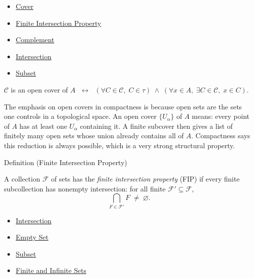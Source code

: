 \begin{dependencies}
\begin{itemize}
  \item \hyperref[def:cover-full]{Cover}
  \item \hyperref[def:fip]{Finite Intersection Property}
  \item \hyperref[def:complement]{Complement}
  \item \hyperref[def:intersection]{Intersection}
  \item \hyperref[def:subset]{Subset}
\end{itemize}
\end{dependencies}

\begin{remark*}
$\mathcal{C}$ is an open cover of $A$ $\;\leftrightarrow\;$ $(\forall C \in \mathcal{C},\; C \in \tau) \;\wedge\; (\forall x \in A,\; \exists C \in \mathcal{C},\; x \in C)$.
\end{remark*}

\begin{remark*}
The emphasis on open covers in compactness is because open sets are the
sets one controls in a topological space. An open cover $\{U_\alpha\}$ of
$A$ means: every point of $A$ has at least one $U_\alpha$ containing it. A
finite subcover then gives a list of finitely many open sets whose union
already contains all of $A$. Compactness says this reduction is always
possible, which is a very strong structural property.
\end{remark*}


\begin{definitionbox}{Definition (Finite Intersection Property)}
\begin{definition}\label{def:fip}
A collection $\mathcal{F}$ of sets has the \emph{finite intersection
property} (FIP) if every finite subcollection has nonempty intersection:
for all finite $\mathcal{F}' \subseteq \mathcal{F}$,
\[
\bigcap_{F \in \mathcal{F}'} F \;\neq\; \varnothing.
\]
\end{definition}
\end{definitionbox}

\begin{dependencies}
\begin{itemize}
  \item \hyperref[def:intersection]{Intersection}
  \item \hyperref[def:empty-set]{Empty Set}
  \item \hyperref[def:subset]{Subset}
  \item \hyperref[def:finite-infinite]{Finite and Infinite Sets}
\end{itemize}
\end{dependencies}

